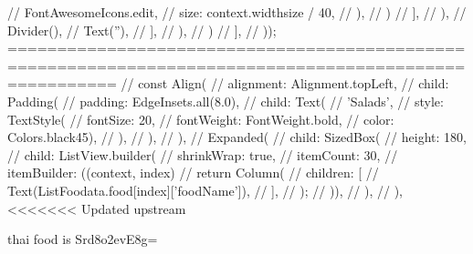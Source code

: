 //                           FontAwesomeIcons.edit,
//                           size: context.widthsize / 40,
//                         ),
//                       )
//                     ],
//                   ),
//                   Divider(),
//                   Text(''),
//                 ],
//               ),
//             )
//           ],
//         ));
=======================================================================================================
// const Align(
                //   alignment: Alignment.topLeft,
                //   child: Padding(
                //     padding: EdgeInsets.all(8.0),
                //     child: Text(
                //       'Salads',
                //       style: TextStyle(
                //           fontSize: 20,
                //           fontWeight: FontWeight.bold,
                //           color: Colors.black45),
                //     ),
                //   ),
                // ),
                // Expanded(
                //   child: SizedBox(
                //     height: 180,
                //     child: ListView.builder(
                //         shrinkWrap: true,
                //         itemCount: 30,
                //         itemBuilder: ((context, index) {
                //           return Column(
                //             children: [
                //               Text(ListFoodata.food[index]['foodName']),
                //             ],
                //           );
                //         })),
                //   ),
                // ),
<<<<<<< Updated upstream

thai food is Srd8o2evE8g=


